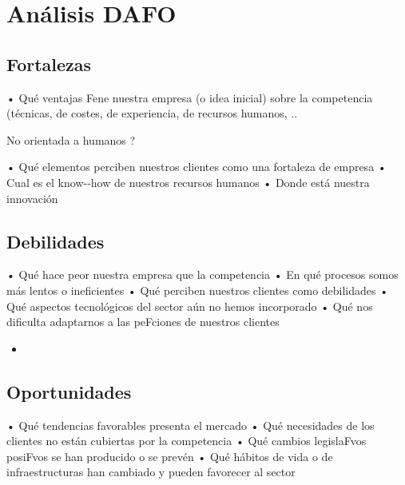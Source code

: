 \section{Análisis DAFO}  

\subsection{Fortalezas}
• Qué ventajas Fene nuestra empresa (o idea inicial) sobre la competencia (técnicas, de costes, de experiencia, de recursos humanos, .. 

No orientada a humanos ?

• Qué elementos perciben nuestros clientes como una fortaleza de empresa 
• Cual es el know-­‐how de nuestros recursos humanos 
• Donde está nuestra innovación 

\begin{itemize}
\end{itemize}

\subsection{Debilidades}
• Qué hace peor nuestra empresa que la competencia 
• En qué procesos somos más lentos o ineficientes 
• Qué perciben nuestros clientes como debilidades 
• Qué aspectos tecnológicos del sector aún no hemos incorporado 
• Qué nos dificulta adaptarnos a las peFciones de nuestros clientes 

\begin{itemize}
    \item 
\end{itemize}

\subsection{Oportunidades}
• Qué tendencias favorables presenta el mercado 
• Qué necesidades de los clientes no están cubiertas por la competencia 
• Qué cambios legislaFvos posiFvos se han producido o se prevén 
• Qué hábitos de vida o de infraestructuras han cambiado y pueden favorecer al sector 

\begin{itemize}
\end{itemize}


